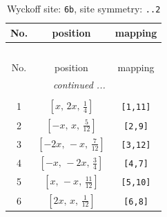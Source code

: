 \documentclass[fleqn,8pt]{jsarticle}
\begin{document}
\begin{longtable}{ccc}
\caption{Wyckoff site: {\tt 6b}, site symmetry: {\tt ..2}}
 \\
 \hline \hline
No. & position & mapping \\ \hline \endfirsthead

\multicolumn{2}{l}{\tablename\ \thetable{}} \\
 \hline \hline
No. & position & mapping \\ \hline \endhead

 \hline \hline
\multicolumn{2}{r}{\footnotesize\it continued ...} \\ \endfoot

 \hline \hline
\multicolumn{2}{r}{} \\ \endlastfoot

1 & $\left[ x,\, 2 x,\, \frac{1}{4} \right]$ & {\tt [1,11]} \\ \hline
2 & $\left[ - x,\, x,\, \frac{5}{12} \right]$ & {\tt [2,9]} \\ \hline
3 & $\left[ - 2 x,\, - x,\, \frac{7}{12} \right]$ & {\tt [3,12]} \\ \hline
4 & $\left[ - x,\, - 2 x,\, \frac{3}{4} \right]$ & {\tt [4,7]} \\ \hline
5 & $\left[ x,\, - x,\, \frac{11}{12} \right]$ & {\tt [5,10]} \\ \hline
6 & $\left[ 2 x,\, x,\, \frac{1}{12} \right]$ & {\tt [6,8]} \\
\end{longtable}
\renewcommand{\arraystretch}{1.2}
\end{document}
